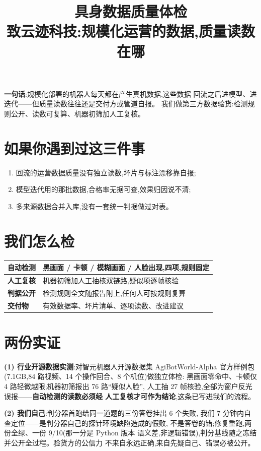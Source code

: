 \documentclass[10pt,a4paper]{ctexart}
\title{\vspace{-1.6em}\textcolor{acc}{具身数据质量体检}\\[0.2em]
\large 致云迹科技:规模化运营的数据,质量读数在哪}
\author{}
\date{}
\begin{document}
\maketitle
\vspace{-3.2em}

\noindent\textbf{一句话}:规模化部署的机器人每天都在产生真机数据,这些数据
回流之后进模型、进迭代——但质量读数往往还是交付方或管道自报。
我们做第三方数据验货:检测规则公开、读数可复算、机器初筛加人工复核。

\section*{如果你遇到过这三件事}
\begin{enumerate}
\item 回流的运营数据质量没有独立读数,坏片与标注漂移靠自报;
\item 模型迭代用的那批数据,合格率无据可查,效果归因说不清;
\item 多来源数据合并入库,没有一套统一判据做过对表。
\end{enumerate}

\section*{我们怎么检}
\noindent
\begin{tabular}{@{}p{2.6cm}p{12.6cm}@{}}
\toprule
\textbf{自动检测} & 黑画面 / 卡顿 / 模糊画面 / 人脸出现,四项,规则固定 \\
\midrule
\textbf{人工复核} & 机器初筛加人工抽核双链路,疑似项逐帧核验 \\
\midrule
\textbf{判据公开} & 检测规则全文随报告附上,任何人可按规则复算 \\
\midrule
\textbf{交付物} & 有效数据率、坏片清单、逐项读数、改进建议 \\
\bottomrule
\end{tabular}

\section*{两份实证}
\textbf{(1) 行业开源数据实测}:对智元机器人开源数据集 AgiBotWorld-Alpha
官方样例包(7.1GB,84 路视频、14 个操作回合、8 个机位)做独立体检:
黑画面零命中、卡顿仅 4 路轻微越限;机器初筛报出 76 路“疑似人脸”,
人工抽 27 帧核验,全部为窗户反光误报——\textbf{自动检测的读数必须经
人工复核才可作为结论},这条已写进我们的流程。

\textbf{(2) 我们自己}:判分器首跑给同一道题的三份答卷挂出 6 个失败,
我们 7 分钟内自查定位——是判分器自己的探针环境缺陷造成的假败,
不是答卷的错;修复重跑,两份全绿、一份 9/10(那一分是 Python 版本
语义差,非逻辑错误),判分基线随之冻结并公开全过程。验货方的公信力
不来自永远正确,来自先疑自己、错误必被公开。
\end{document}
